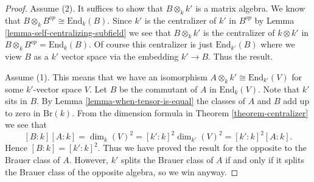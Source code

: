 \documentclass[10pt,a4paper]{amsart}
\theoremstyle{plain}
\theoremstyle{definition}
\theoremstyle{remark}
\numberwithin{equation}{subsection}
\begin{document}
\begin{proof}
Assume (2). It suffices to show that $B \otimes_k k'$ is a matrix
algebra. We know that $B \otimes_k B^{op} \cong \text{End}_k(B)$.
Since $k'$ is the centralizer of $k'$ in $B^{op}$ by
Lemma \ref{lemma-self-centralizing-subfield}
we see that $B \otimes_k k'$ is the centralizer of $k \otimes k'$
in $B \otimes_k B^{op} = \text{End}_k(B)$. Of course this centralizer
is just $\text{End}_{k'}(B)$ where we view $B$ as a $k'$ vector space
via the embedding $k' \to B$. Thus the result.

\medskip\noindent
Assume (1). This means that we have an isomorphism
$A \otimes_k k' \cong \text{End}_{k'}(V)$ for some $k'$-vector space $V$.
Let $B$ be the commutant of $A$ in $\text{End}_k(V)$. Note that
$k'$ sits in $B$. By
Lemma \ref{lemma-when-tensor-is-equal}
the classes of $A$ and $B$ add up to zero in $\text{Br}(k)$.
From the dimension formula in
Theorem \ref{theorem-centralizer}
we see that
$$
[B : k] [A : k] =
\dim_k(V)^2 =
[k' : k]^2 \dim_{k'}(V)^2 =
[k' : k]^2 [A : k].
$$
Hence $[B : k] = [k' : k]^2$. Thus we have proved the result for the
opposite to the Brauer class of $A$. However, $k'$ splits the Brauer
class of $A$ if and only if it splits
the Brauer class of the opposite algebra, so we win anyway.
\end{proof}
\end{document}

